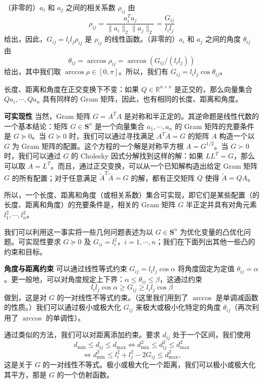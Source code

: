 \documentclass[UTF8, 12pt, fontset=fandol, oneside]{ctexart}
\begin{document}
（非零的）$a_i$ 和 $a_j$ 之间的相关系数 $\rho_{ij}$ 由
\[
\rho_{ij}=\frac{a_i^Ta_j}{\|a_i\|_2\|a_j\|_2}=\frac{G_{ij}}{l_il_j}
\]
给出，因此，$G_{ij}=l_il_j\rho_{ij}$ 是 $\rho_{ij}$ 的线性函数。（非零的）$a_i$ 和 $a_j$ 之间的角度 $\theta_{ij}$ 由
\[
\theta_{ij}=\arccos\rho_{ij}=\arccos(G_{ij}/(l_il_j))
\]
给出，其中我们取 $\arccos\rho\in[0,\pi]$。所以，我们有 $G_{ij}=l_il_j\cos\theta_{ij}$。

长度、距离和角度在正交变换下不变：如果 $Q\in\mathbb{R}^{n\times n}$ 是正交的，那么向量集合 $Qa_i,\cdots,Qa_n$ 具有同样的 Gram 矩阵，因此，也有相同的长度、距离和角度。

\noindent\textbf{可实现性}\quad
当然，Gram 矩阵 $G=A^TA$ 是对称和半正定的。其逆命题是线性代数的一个基本结论：矩阵 $G\in\mathbf{S}^n$ 是一个向量集合 $a_1,\cdots,a_n$ 的 Gram 矩阵的充要条件是 $G\succeq 0$。当 $G\succeq 0$ 时，我们可以通过寻找满足 $A^TA=G$ 的矩阵 $A$ 构造一个以 $G$ 为 Gram 矩阵的配置。这个方程的一个解是对称平方根 $A=G^{1/2}$。当 $G\succ 0$ 时，我们可以通过 $G$ 的 Cholesky 因式分解找到这样的解：如果 $LL^T=G$，那么可以取 $A=L^T$。而且，通过正交变换，可以从一个已知解构造出给定 Gram 矩阵 $G$ 的所有配置；对于任意满足 $\tilde{A}^T\tilde{A}=G$ 的解，都有正交矩阵 $Q$ 使得 $\tilde{A}=QA$。

所以，一个长度、距离和角度（或相关系数）集合可实现，即它们是某些配置（的长度、距离和角度）的充要条件是，相关的 Gram 矩阵 $G$ 半正定并具有对角元素 $l_1^2,\cdots,l_n^2$。

我们可以利用这一事实将一些几何问题表述为以 $G\in\mathbf{S}^n$ 为优化变量的凸优化问题。可实现性要求 $G\succeq 0$ 及 $G_{ii}=l_i^2$，$i=1,\cdots,n$；我们在下面列出其他一些凸的约束和目标。

\noindent\textbf{角度与距离约束}\quad
可以通过线性等式约束 $G_{ij}=l_il_j\cos\alpha$ 将角度固定为定值 $\theta_{ij}=\alpha$。更一般地，可以对角度规定上下界：$\alpha\leq\theta_{ij}\leq\beta$，这通过约束
\[
l_il_j\cos\alpha\geq G_{ij}\geq l_il_j\cos\beta
\]
做到，这是对 $G$ 的一对线性不等式约束。（这里我们用到了 $\arccos$ 是单调减函数的性质。）我们可以通过极小或极大化 $G_{ij}$ 来极大或极小化特定的角度 $\theta_{ij}$（再次利用了 $\arccos$ 的单调性）。

通过类似的方法，我们可以对距离添加约束。要求 $d_{ij}$ 处于一个区间，我们使用
\[
d_{\min}\leq d_{ij}\leq d_{\max}\Longleftrightarrow d_{\min}^2\leq d_{ij}^2\leq d_{\max}^2
\]
\[
\Longleftrightarrow d_{\min}^2\leq l_i^2+l_j^2-2G_{ij}\leq d_{\max}^2,
\]
这是关于 $G$ 的一对线性不等式。极小或极大化一个距离，我们可以极小或极大化其平方，那是 $G$ 的一个仿射函数。
\end{document}
